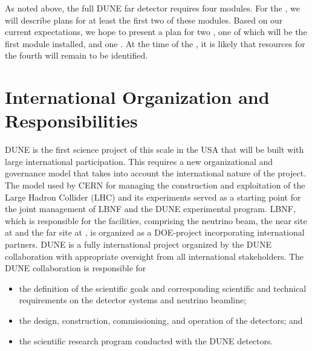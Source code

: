 As noted above, the full DUNE far detector requires four modules. For the , we will describe plans for at least the first two of these modules. Based on our current expectations, we hope to present a plan for two , one of which will be the first module installed, and one . At the time of the , it is likely that resources for the fourth  will remain to be identified. 


\section{International Organization and Responsibilities}

DUNE is the first science project of this scale in the USA that will be built with large
international participation. This requires a new organizational and governance model that takes into account the international nature of the project.
The
model used by CERN for managing the construction and exploitation of the Large Hadron Collider (LHC) and its experiments served as a starting point for the joint management of LBNF and the DUNE experimental program. 
LBNF, which is responsible for the facilities, comprising the neutrino beam, the near site at \fnal and the far site at \surf, is organized as a
DOE-\fnal project incorporating international partners. 
DUNE is a fully international project
organized by the DUNE collaboration with appropriate oversight from all international stakeholders.
The DUNE collaboration is responsible for
\begin{itemize}
\item the definition of the scientific goals and corresponding scientific and technical requirements on the detector systems and neutrino beamline;
\item the design, construction, commissioning, and operation of the detectors; and
\item the scientific research program conducted with the DUNE detectors. 
\end{itemize}

